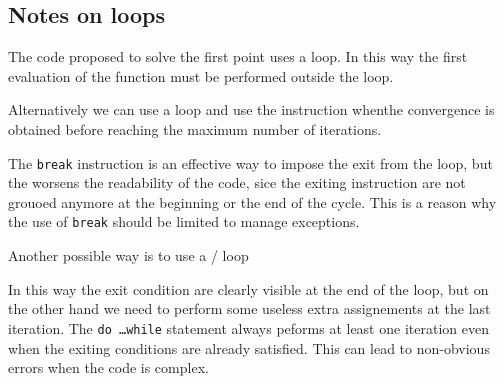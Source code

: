 \subsection*{Notes on loops}

The code proposed to solve the first point uses a  loop.
In this way the first evaluation of the function must be performed outside the
loop.

Alternatively we can use a  loop and use the  instruction
whenthe convergence is obtained before reaching the maximum number of
iterations.
\lstset{basicstyle=\scriptsize\sf}
    
\lstset{basicstyle=\sf}
The \texttt{break} instruction is an effective way to impose the exit from the
loop, but the worsens the readability of the code, sice the exiting instruction
are not grouoed anymore at the beginning or the end of the cycle. This is a
reason why the use of \texttt{break} should be limited to manage exceptions.

Another possible way is to use a / loop
\lstset{basicstyle=\scriptsize\sf}
    
\lstset{basicstyle=\sf}
In this way the exit condition are clearly visible at the end of the loop, but
on the other hand we need to perform some useless extra assignements at the last
iteration. The \texttt{do \ldots while} statement always peforms at least one
iteration even when the exiting conditions are already satisfied. This can lead
to non-obvious errors when the code is complex.

